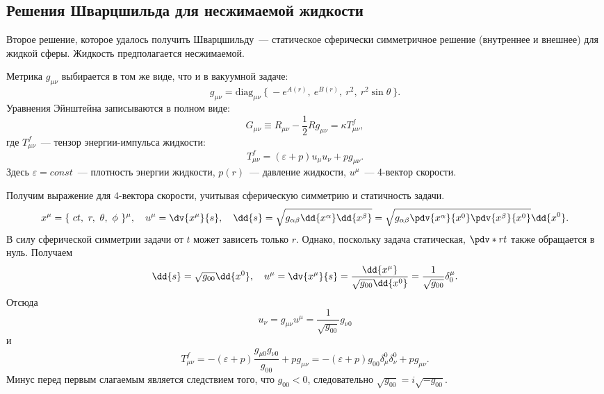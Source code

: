 \documentclass[\docroot/reports/draft/report.tex]{subfiles}
\begin{document}
\subsection{Решения Шварцшильда для несжимаемой жидкости}

    Второе решение, которое удалось получить Шварцшильду~--- статическое сферически симметричное решение (внутреннее и внешнее) для жидкой сферы. Жидкость предполагается несжимаемой.

    Метрика $g_{\mu\nu}$ выбирается в том же виде, что и в вакуумной задаче:
    \begin{equation*}
        g_{\mu\nu} = \text{diag}_{\mu\nu}\ \{\ -e^{A(r)},\ e^{B(r)},\ r^2,\ r^2 \sin\theta \ \} .
    \end{equation*}
    Уравнения Эйнштейна записываются в полном виде:
    \begin{equation*}
        G_{\mu\nu} \equiv R_{\mu\nu} - \frac{1}{2} R g_{\mu\nu} = \kappa T^f_{\mu\nu} ,
    \end{equation*}
    где $T^f_{\mu\nu}$~--- тензор энергии-импульса жидкости:
    \begin{equation*}
        T^f_{\mu\nu} = (\varepsilon + p) u_\mu u_\nu + p g_{\mu\nu} .
    \end{equation*}
    Здесь $\varepsilon = const$~--- плотность энергии жидкости, $p(r)$~--- давление жидкости, $u^\mu$~--- 4-вектор скорости.

    Получим выражение для 4-вектора скорости, учитывая сферическую симметрию и статичность задачи.
    \begin{equation*}
        x^\mu = \{\ ct,\ r,\ \theta,\ \phi \ \}^\mu , \quad
        u^\mu = \dv{x^\mu}{s} , \quad
        \dd{s} = \sqrt{ g_{\alpha\beta} \dd{x^\alpha} \dd{x^\beta} }
               = \sqrt{ g_{\alpha\beta} \pdv{x^\alpha}{x^0} \pdv{x^\beta}{x^0} } \dd{x^0} .
    \end{equation*}
    В силу сферической симметрии задачи от $t$ может зависеть только $r$. Однако, поскольку задача статическая, $\pdv*{r}{t}$ также обращается в нуль. Получаем
    \begin{equation*}
        \dd{s} = \sqrt{ g_{00} } \dd{x^0} , \quad
        u^\mu = \dv{x^\mu}{s}
              = \frac{\dd{x^\mu}}{\sqrt{g_{00}} \dd{x^0}}
              = \frac{1}{\sqrt{g_{00}}} \delta^\mu_0 .
    \end{equation*}
    Отсюда
    \begin{equation*}
        u_\nu = g_{\mu\nu} u^\mu = \frac{1}{\sqrt{g_{00}}} g_{\nu 0}
    \end{equation*}
    и
    \begin{equation*}
        T^f_{\mu\nu} = - (\varepsilon + p) \frac{g_{\mu 0} g_{\nu 0}}{g_{00}} + p g_{\mu\nu}
                     = - (\varepsilon + p) g_{00} \delta^0_\mu \delta^0_\nu + p g_{\mu\nu} .
    \end{equation*}
    Минус перед первым слагаемым является следствием того, что $g_{00} < 0$, следовательно $\sqrt{g_{00}} = i \sqrt{-g_{00}}$.
\end{document}
